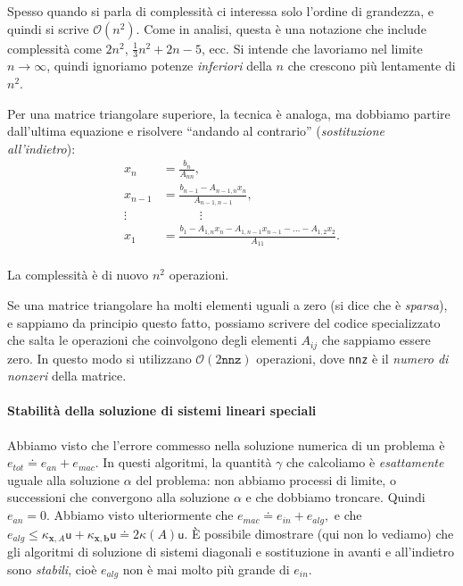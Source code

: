 \documentclass[a4paper]{report}
\theoremstyle{definiton}
\theoremstyle{remark}
\newcommand{\x}{\mathbf{x}}
\renewcommand{\b}{\mathbf{b}}
\begin{document}
Spesso quando si parla di complessità ci interessa solo l'ordine di grandezza, e quindi si scrive $\mathcal{O}(n^2)$. Come in analisi, questa è una notazione che include complessità come $2n^2$, $\frac{1}{3}n^2 + 2n - 5$, ecc. Si intende che lavoriamo nel limite $n\to \infty$, quindi ignoriamo potenze \emph{inferiori} della $n$ che crescono più lentamente di $n^2$. 

Per una matrice triangolare superiore, la tecnica è analoga, ma dobbiamo partire dall'ultima equazione e risolvere ``andando al contrario'' (\emph{sostituzione all'indietro}):
\begin{align*}
x_n &= \frac{b_n}{A_{nn}},\\
x_{n-1} &= \frac{b_{n-1} - A_{n-1,n}x_n}{A_{n-1,n-1}},\\
\vdots & \quad \quad \quad \vdots\\
x_1 &= \frac{b_1 - A_{1,n}x_n - A_{1,n-1}x_{n-1} - \dots -A_{1,2}x_{2}}{A_{11}}.\\
\end{align*}

La complessità è di nuovo $n^2$ operazioni.

Se una matrice triangolare ha molti elementi uguali a zero (si dice che è \emph{sparsa}), e sappiamo da principio questo fatto, possiamo scrivere del codice specializzato che salta le operazioni che coinvolgono degli elementi $A_{ij}$ che sappiamo essere zero. In questo modo si utilizzano $\mathcal{O}(2\texttt{nnz})$ operazioni, dove \texttt{nnz} è il \emph{numero di nonzeri} della matrice.

\paragraph{Stabilità della soluzione di sistemi lineari speciali} Abbiamo visto che l'errore commesso nella soluzione numerica di un problema è $e_{tot} \doteq e_{an} + e_{mac}$. In questi algoritmi, la quantità $\gamma$ che calcoliamo è \emph{esattamente} uguale alla soluzione $\alpha$ del problema: non abbiamo processi di limite, o successioni che convergono alla soluzione $\alpha$ e che dobbiamo troncare. Quindi $e_{an} = 0$. Abbiamo visto ulteriormente che 
$e_{mac} \doteq e_{in} + e_{alg},$ e che $e_{alg} \leq \kappa_{\x,A}\mathsf{u} + \kappa_{\x,\b} \mathsf{u} \doteq 2\kappa(A)\mathsf{u}$. È possibile dimostrare (qui non lo vediamo) che gli algoritmi di soluzione di sistemi diagonali e sostituzione in avanti e all'indietro sono \emph{stabili}, cioè $e_{alg}$ non è mai molto più grande di $e_{in}$.
\end{document}
